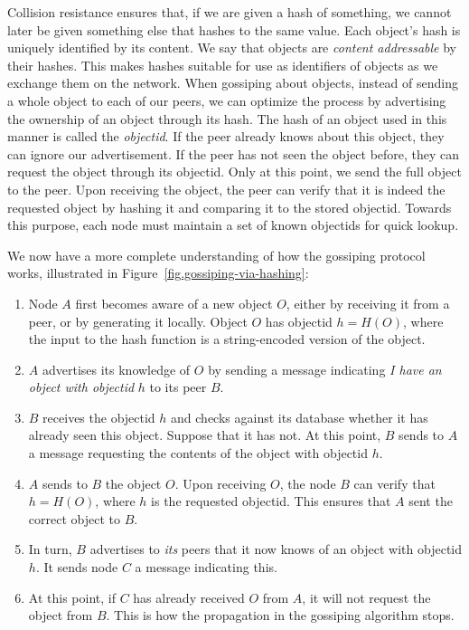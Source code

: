 Collision resistance ensures that, if we are given a hash of something, we cannot
later be given something else that hashes to the same value. Each object's hash
is uniquely identified by its content. We say that objects are
\emph{content addressable}
by their hashes.
This makes hashes suitable
for use as identifiers of objects as we exchange them on the network. When gossiping
about objects, instead of sending a whole object to each of our peers, we can optimize
the process by advertising the ownership of an object through its hash. The hash of
an object used in this manner is called the \emph{objectid}. If the peer already knows
about this object, they can ignore our advertisement. If the peer has not seen the
object before, they can request the object through its objectid. Only at this point, we
send the full object to the peer. Upon receiving the object, the peer can verify that
it is indeed the requested object by hashing it and comparing it to the stored objectid.
Towards this purpose, each node must maintain a set of known objectids for quick lookup.

We now have a more complete understanding of how the gossiping protocol works,
illustrated in Figure~\ref{fig.gossiping-via-hashing}:

\begin{enumerate}
  \item Node $A$ first becomes aware of a new object $O$, either by receiving it from a peer,
        or by generating it locally. Object $O$ has objectid $h = H(O)$, where the input to the
        hash function is a string-encoded version of the object.
  \item $A$ advertises its knowledge of $O$ by sending a message
        indicating \emph{I have an object with objectid} $h$ to its peer $B$.
  \item $B$ receives the objectid $h$ and checks against its database whether it has already seen
        this object. Suppose that it has not. At this point, $B$ sends to $A$ a message
        requesting the contents of the object with objectid $h$.
  \item $A$ sends to $B$ the object $O$. Upon receiving $O$, the node $B$ can verify that
        $h = H(O)$, where $h$ is the requested objectid. This ensures that $A$ sent the
        correct object to $B$.
  \item In turn, $B$ advertises to \emph{its} peers that it now knows of an object with
        objectid $h$. It sends node $C$ a message indicating this.
  \item At this point, if $C$ has already received $O$ from $A$, it will not request
        the object from $B$. This is how the propagation in the gossiping algorithm stops.
\end{enumerate}

